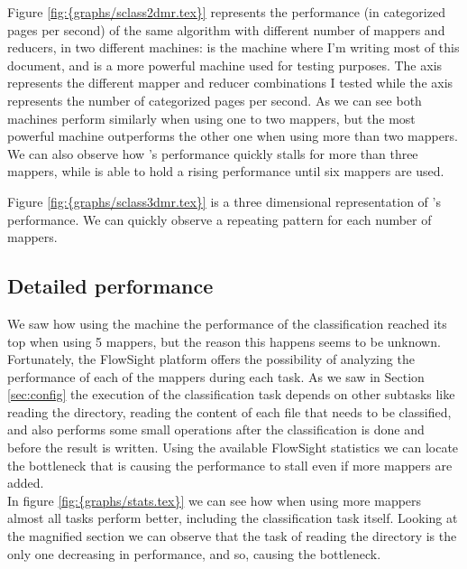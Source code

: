 Figure \ref{fig:{graphs/sclass2dmr.tex}} represents the performance (in categorized pages per second) of the same algorithm with different number of mappers and reducers, in two different machines:  
is the machine where I'm writing most of this document, and  is a more powerful machine used for testing purposes. The  axis represents the 
different mapper and reducer combinations I tested while the  axis represents the number of categorized pages per second.
As we can see both machines perform similarly when using one to two mappers, but the most powerful machine outperforms the other one when using more than two mappers. We can also observe how 's performance
quickly stalls for more than three mappers, while  is able to hold a rising performance until six mappers are used.

Figure \ref{fig:{graphs/sclass3dmr.tex}} is a three dimensional representation of 's performance. We can quickly observe a repeating pattern for each number of mappers.

\subsection{Detailed performance}
We saw how using the  machine the performance of the classification reached its top when using 5 mappers, but the reason this happens seems to be unknown. 
Fortunately, the FlowSight platform offers the possibility of analyzing the performance of each of the mappers during each task. As we saw in Section \ref{sec:config} the execution of the classification
task depends on other subtasks like reading the directory, reading the content of each file that needs to be classified, and also performs some small operations after the classification is done and before
the result is written. Using the available FlowSight statistics we can locate the bottleneck that is causing the performance to stall even if more mappers are added. \\ 
In figure \ref{fig:{graphs/stats.tex}} we can see how when using more mappers almost all tasks perform better, including the classification task itself. Looking at the magnified section we can observe
that the task of reading the directory is the only one decreasing in performance, and so, causing the bottleneck. 



